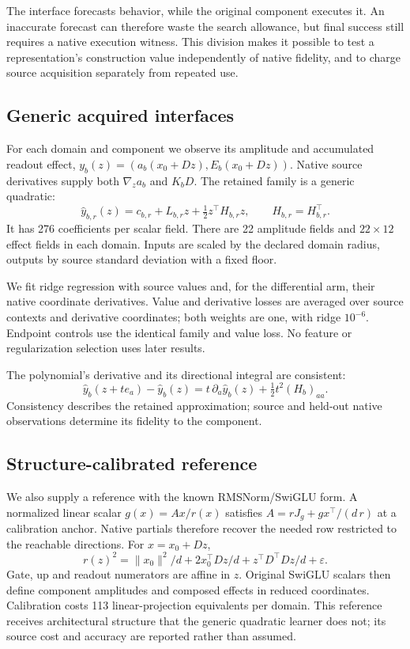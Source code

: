 \documentclass[11pt]{article}
\newcommand{\eps}{\varepsilon}
\begin{document}
The interface forecasts behavior, while the original component executes it.
An inaccurate forecast can therefore waste the search allowance, but final
success still requires a native execution witness. This division makes it
possible to test a representation's construction value independently of native
fidelity, and to charge source acquisition separately from repeated use.

\subsection{Generic acquired interfaces}
For each domain and component we observe its amplitude and accumulated
readout effect,
$y_b(z)=(a_b(x_0+Dz),E_b(x_0+Dz))$.
Native source derivatives supply both $\nabla_z a_b$ and $K_bD$.
The retained family is a generic quadratic:
\begin{equation}
 \widehat y_{b,r}(z)=c_{b,r}+L_{b,r}z+\tfrac12z^\top H_{b,r}z,
 \qquad H_{b,r}=H_{b,r}^\top .
 \label{eq:quad}
\end{equation}
It has 276 coefficients per scalar field. There are 22 amplitude fields and
$22\times12$ effect fields in each domain. Inputs are scaled by the declared
domain radius, outputs by source standard deviation with a fixed floor.

We fit ridge regression with source values and, for the differential arm,
their native coordinate derivatives. Value and derivative losses are averaged
over source contexts and derivative coordinates; both weights are one,
with ridge $10^{-6}$. Endpoint controls use the identical family and value
loss. No feature or regularization selection uses later results.

The polynomial's derivative and its directional integral are consistent:
\[
 \widehat y_b(z+te_a)-\widehat y_b(z)
 =t\,\partial_a\widehat y_b(z)+\tfrac12t^2(H_b)_{aa}.
\]
Consistency describes the retained approximation; source and held-out native
observations determine its fidelity to the component.

\subsection{Structure-calibrated reference}
We also supply a reference with the known RMSNorm/SwiGLU form. A normalized
linear scalar $g(x)=Ax/r(x)$ satisfies
$A=rJ_g+gx^\top/(d\,r)$ at a calibration anchor. Native partials therefore
recover the needed row restricted to the reachable directions.
For $x=x_0+Dz$,
\[
 r(z)^2=\|x_0\|^2/d+2x_0^\top Dz/d+z^\top D^\top Dz/d+\eps .
\]
Gate, up and readout numerators are affine in $z$. Original SwiGLU scalars
then define component amplitudes and composed effects in reduced coordinates.
Calibration costs 113 linear-projection equivalents per domain. This reference
receives architectural structure that the generic quadratic learner does not;
its source cost and accuracy are reported rather than assumed.
\end{document}
